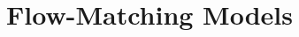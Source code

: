 \setcounter{chapter}{26}

\hypertarget{flow-matching-models}{%
\chapter{Flow-Matching Models}\label{flow-matching-models}}
